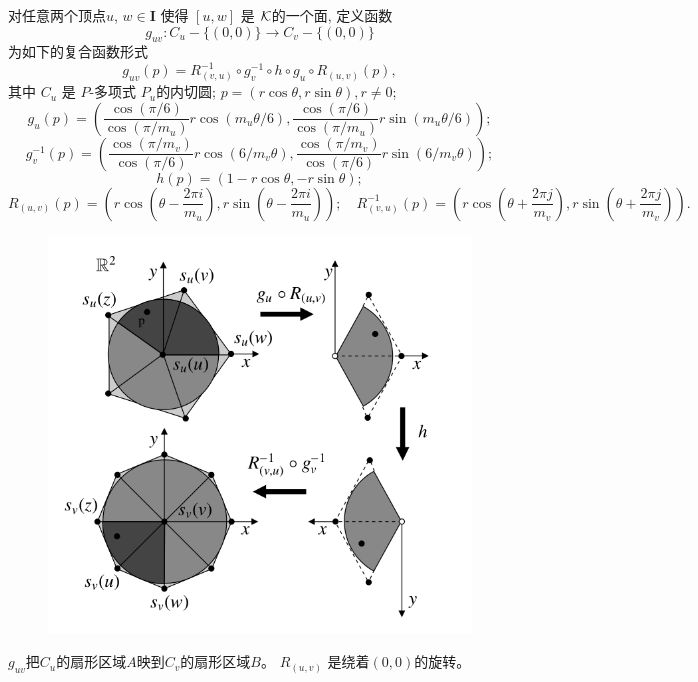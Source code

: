 \begin{defn}
    对任意两个顶点$u$, $w\in\mathbf{I}$
    使得 $[u,w]$ 是 ${\cal K}$的一个面,
    定义函数
    \begin{displaymath}
      g_{uv}:C_u-\{(0,0)\}\rightarrow C_v-\{(0,0)\}
    \end{displaymath}
   为如下的复合函数形式
    \begin{displaymath}
       g_{uv}(p)=R^{-1}_{(v,u)}\circ g_v^{-1}\circ h
      \circ g_u\circ R_{(u,v)}(p),
    \end{displaymath}
    其中 $C_u$ 是 $P$-多项式 $P_u$的内切圆;
    $p=(r\cos\theta,r\sin\theta),r\neq 0$;
    \begin{equation}
    g_u(p)=\left(\frac{\cos(\pi/6)}{\cos(\pi/m_u)}r\cos(m_u\theta/6),
    \frac{\cos(\pi/6)}{\cos(\pi/m_u)}r\sin(m_u\theta/6)\right);
\end{equation}
\begin{equation}
     g_v^{-1}(p)=\left(\frac{\cos(\pi/m_v)}
      {\cos(\pi/6)}r\cos(6/m_v\theta),
    \frac{\cos(\pi/m_v)}{\cos(\pi/6)}r\sin(6/m_v\theta)\right);
\end{equation}
\begin{equation}
   h(p)=(1-r\cos\theta,-r\sin\theta);
\end{equation}
\begin{equation}
  R_{(u,v)}(p)=\left(r\cos\left(\theta-\frac{2\pi i}{m_u}\right),
    r\sin\left(\theta-\frac{2\pi i}{m_u}\right)\right);\quad
  R^{-1}_{(v,u)}(p)=\left(r\cos\left(\theta+\frac{2\pi j}{m_v}\right),
  r\sin\left(\theta+\frac{2\pi j}{m_v}\right)\right).
\end{equation}
  \end{defn}
\begin{figure}[H]
    \centering
    \includegraphics[width=0.3\linewidth]{fig/transferSector}
    \label{fig:sector}
  \end{figure}
  \begin{rem}
    $g_{uv}$把$C_u$的扇形区域$A$映到$C_v$的扇形区域$B$。
     $R_{(u,v)}$ 是绕着$(0,0)$的旋转。
  \end{rem}
  
